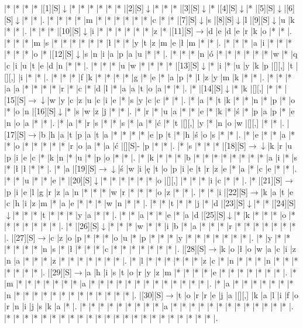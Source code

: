 \documentclass[11pt]{article}
\newcommand\drarr{$\rightarrow \!\!\!\!\! \downarrow$}
\newcommand\rarr{$\rightarrow$}
\newcommand\darr{$\downarrow$}
\begin{document}
\noindent\begin{Puzzle}{22}{33}|*	|*	|*	|*	|[1][S]\darr	|*	|*	|*	|*	|*	|*	|[2][S]\darr	|*	|*	|*	|[3][S]\darr	|*	|[4][S]\darr	|*	|[5][S]\darr	|[6][S]\darr	|*	|*	|.
|*	|*	|*	|*	|m	|*	|*	|*	|*	|*	|*	|c	|*	|*	|[7][S]\darr	|s	|[8][S]\darr	|l	|[9][S]\darr	|u	|k	|*	|*	|.
|*	|*	|*	|[10][S]\darr	|i	|*	|*	|*	|*	|*	|*	|z	|*	|[11][S]\rarr	|d	|e	|d	|e	|r	|k	|o	|*	|*	|.
|*	|*	|*	|m	|s	|*	|*	|*	|*	|*	|*	|ł	|*	|*	|y	|t	|z	|m	|e	|ł	|m	|*	|*	|.
|*	|*	|*	|a	|i	|*	|*	|*	|*	|*	|*	|o	|*	|[12][S]\darr	|s	|n	|i	|a	|p	|a	|u	|*	|*	|.
|*	|*	|*	|n	|ó	|*	|*	|*	|*	|*	|*	|w	|*	|q	|c	|i	|u	|t	|e	|d	|n	|*	|*	|.
|*	|*	|*	|u	|w	|*	|*	|*	|*	|[13][S]\darr	|*	|i	|*	|u	|y	|k	|p	|[][,]{ }	|t	|[][,]{ }	|i	|*	|*	|.
|*	|*	|*	|f	|k	|*	|*	|*	|*	|g	|*	|e	|*	|a	|p	|*	|l	|z	|y	|m	|k	|*	|*	|.
|*	|*	|*	|a	|a	|*	|*	|*	|*	|r	|*	|c	|*	|d	|l	|*	|a	|a	|t	|o	|a	|*	|*	|.
|*	|[14][S]\darr	|*	|k	|[][,]{ }	|*	|*	|[15][S]\drarr	|w	|y	|c	|z	|u	|c	|i	|e	|*	|s	|y	|c	|c	|*	|*	|.
|*	|a	|*	|t	|k	|*	|*	|n	|*	|p	|*	|o	|*	|o	|n	|[16][S]\darr	|*	|s	|w	|z	|j	|*	|*	|.
|*	|r	|*	|u	|a	|*	|*	|e	|*	|k	|*	|ś	|*	|p	|a	|p	|*	|e	|n	|o	|a	|*	|*	|.
|*	|a	|*	|r	|s	|*	|*	|s	|*	|a	|*	|ć	|*	|t	|[][,]{ }	|y	|*	|n	|o	|w	|[][,]{ }	|*	|*	|.
|[17][S]\rarr	|b	|h	|a	|t	|p	|a	|t	|a	|*	|*	|*	|*	|e	|p	|t	|*	|h	|ś	|o	|s	|*	|*	|.
|*	|e	|*	|*	|a	|*	|*	|o	|*	|*	|*	|*	|*	|r	|o	|a	|*	|a	|ć	|[][S]-	|p	|*	|*	|.
|*	|s	|*	|*	|*	|[18][S]\drarr	|k	|r	|u	|p	|i	|e	|c	|*	|k	|n	|*	|u	|*	|p	|o	|*	|*	|.
|*	|k	|*	|*	|*	|b	|*	|*	|*	|*	|*	|*	|*	|*	|a	|i	|*	|s	|*	|ł	|ł	|*	|*	|.
|*	|a	|[19][S]\drarr	|ś	|w	|i	|ę	|t	|o	|p	|i	|e	|t	|r	|z	|e	|*	|a	|*	|c	|e	|*	|*	|.
|*	|*	|u	|*	|*	|e	|*	|[20][S]\darr	|*	|*	|*	|*	|*	|*	|o	|[][,]{ }	|*	|*	|*	|i	|c	|*	|*	|.
|*	|[21][S]\rarr	|p	|i	|e	|l	|g	|r	|z	|a	|n	|*	|*	|*	|w	|r	|*	|*	|*	|o	|z	|*	|*	|.
|*	|*	|i	|[22][S]\rarr	|k	|a	|t	|e	|c	|h	|i	|z	|m	|*	|a	|e	|*	|*	|*	|w	|n	|*	|*	|.
|*	|*	|t	|*	|*	|j	|*	|d	|[23][S]\darr	|*	|*	|[24][S]\darr	|*	|*	|*	|t	|*	|*	|*	|y	|a	|*	|*	|.
|*	|*	|a	|*	|*	|e	|*	|a	|d	|[25][S]\darr	|*	|k	|*	|*	|*	|o	|*	|*	|*	|*	|*	|*	|*	|.
|*	|[26][S]\darr	|*	|*	|*	|w	|*	|*	|i	|b	|*	|a	|*	|*	|*	|r	|*	|*	|*	|*	|*	|*	|*	|.
|[27][S]\rarr	|c	|z	|o	|p	|*	|*	|*	|o	|u	|*	|p	|*	|*	|*	|y	|*	|*	|*	|*	|*	|*	|*	|.
|*	|y	|*	|*	|*	|*	|*	|*	|n	|s	|*	|ł	|*	|*	|*	|c	|*	|*	|*	|*	|*	|*	|*	|.
|[28][S]\rarr	|k	|o	|ł	|o	|w	|a	|c	|i	|z	|n	|a	|*	|*	|*	|z	|*	|*	|*	|*	|*	|*	|*	|.
|*	|l	|*	|*	|*	|*	|*	|*	|z	|c	|*	|n	|*	|*	|*	|n	|*	|*	|*	|*	|*	|*	|*	|.
|[29][S]\rarr	|a	|h	|i	|s	|t	|o	|r	|y	|z	|m	|*	|*	|*	|*	|e	|*	|*	|*	|*	|*	|*	|*	|.
|*	|m	|*	|*	|*	|*	|*	|*	|*	|a	|*	|*	|*	|*	|*	|*	|*	|*	|*	|*	|*	|*	|*	|.
|*	|a	|*	|*	|*	|*	|*	|*	|*	|n	|*	|*	|*	|*	|*	|*	|*	|*	|*	|*	|*	|*	|*	|.
|[30][S]\rarr	|t	|o	|r	|r	|e	|j	|a	|[][,]{ }	|k	|a	|l	|i	|f	|o	|r	|n	|i	|j	|s	|k	|a	|*	|.
|*	|*	|*	|*	|*	|*	|*	|*	|*	|a	|*	|*	|*	|*	|*	|*	|*	|*	|*	|*	|*	|*	|*	|.
|*	|*	|*	|*	|*	|*	|*	|*	|*	|*	|*	|*	|*	|*	|*	|*	|*	|*	|*	|*	|*	|*	|*	|.\end{Puzzle}
\end{document}
